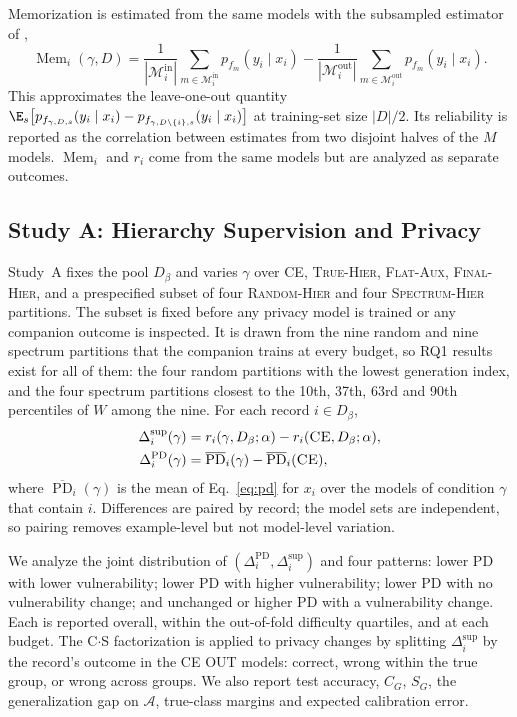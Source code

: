 \documentclass{article} %
\newcommand{\cn}[1]{\textsc{#1}}
\newcommand{\PD}{\operatorname{PD}}
\newcommand{\Mem}{\operatorname{Mem}}
\newcommand{\audit}{\mathcal{A}}
\newcommand{\inset}{\mathcal{M}^{\mathrm{in}}}
\newcommand{\outset}{\mathcal{M}^{\mathrm{out}}}
\begin{document}
Memorization is estimated from the same models with the subsampled estimator of \citet{feldman2020neural},
\begin{equation}
\Mem_i(\gamma,D)=\frac{1}{|\inset_i|}\sum_{m\in\inset_i}p_{f_m}(y_i\mid x_i)-\frac{1}{|\outset_i|}\sum_{m\in\outset_i}p_{f_m}(y_i\mid x_i).
\label{eq:mem}
\end{equation}
This approximates the leave-one-out quantity $\E_s\big[p_{f_{\gamma,D,s}}(y_i\mid x_i)-p_{f_{\gamma,D\setminus\{i\},s}}(y_i\mid x_i)\big]$ at training-set size $|D|/2$. Its reliability is reported as the correlation between estimates from two disjoint halves of the $M$ models. $\Mem_i$ and $r_i$ come from the same models but are analyzed as separate outcomes.

\subsection{Study A: Hierarchy Supervision and Privacy}
\label{sec:studyA}

Study~A fixes the pool $D_\beta$ and varies $\gamma$ over \cn{CE}, \cn{True-Hier}, \cn{Flat-Aux}, \cn{Final-Hier}, and a prespecified subset of four \cn{Random-Hier} and four \cn{Spectrum-Hier} partitions. The subset is fixed before any privacy model is trained or any companion outcome is inspected. It is drawn from the nine random and nine spectrum partitions that the companion trains at every budget, so RQ1 results exist for all of them: the four random partitions with the lowest generation index, and the four spectrum partitions closest to the 10th, 37th, 63rd and 90th percentiles of $W$ among the nine. For each record $i\in D_\beta$,
\begin{align}
\Delta_i^{\mathrm{sup}}(\gamma)&=r_i(\gamma,D_\beta;\alpha)-r_i(\cn{CE},D_\beta;\alpha), \label{eq:dsup}\\
\Delta_i^{\mathrm{PD}}(\gamma)&=\overline{\PD}_i(\gamma)-\overline{\PD}_i(\cn{CE}), \label{eq:dpd}
\end{align}
where $\overline{\PD}_i(\gamma)$ is the mean of Eq.~\ref{eq:pd} for $x_i$ over the models of condition $\gamma$ that contain $i$. Differences are paired by record; the model sets are independent, so pairing removes example-level but not model-level variation.

We analyze the joint distribution of $(\Delta_i^{\mathrm{PD}},\Delta_i^{\mathrm{sup}})$ and four patterns: lower PD with lower vulnerability; lower PD with higher vulnerability; lower PD with no vulnerability change; and unchanged or higher PD with a vulnerability change. Each is reported overall, within the out-of-fold difficulty quartiles, and at each budget. The C$\cdot$S factorization is applied to privacy changes by splitting $\Delta_i^{\mathrm{sup}}$ by the record's outcome in the \cn{CE} OUT models: correct, wrong within the true group, or wrong across groups. We also report test accuracy, $C_G$, $S_G$, the generalization gap on $\audit$, true-class margins and expected calibration error.
\end{document}
